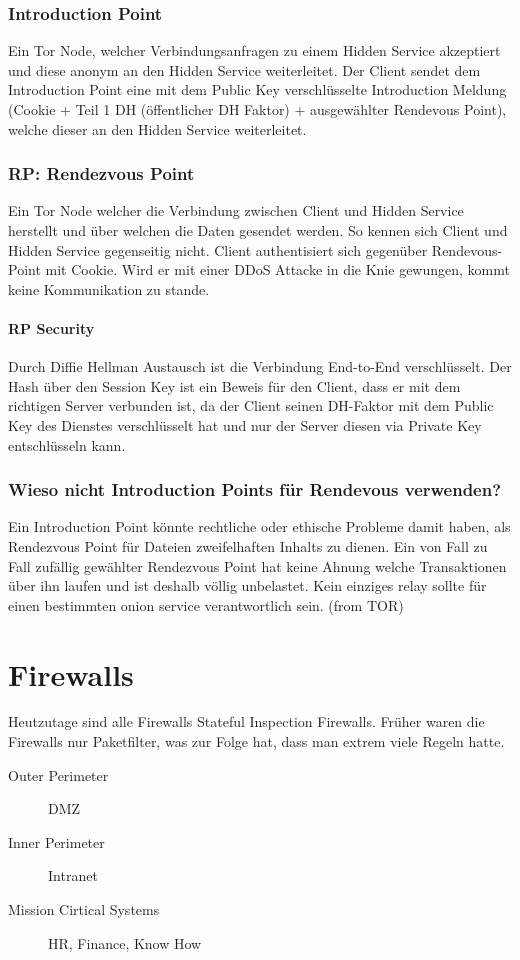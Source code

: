 \subsubsection{Introduction Point}
Ein Tor Node, welcher Verbindungsanfragen zu einem Hidden Service akzeptiert und diese anonym an den Hidden Service weiterleitet. Der Client sendet dem Introduction Point eine mit dem Public Key verschlüsselte Introduction Meldung (Cookie + Teil 1 DH (öffentlicher DH Faktor) + ausgewählter Rendevous Point), welche dieser an den Hidden Service weiterleitet. 

\subsubsection{RP: Rendezvous Point}
Ein Tor Node welcher die Verbindung zwischen Client und Hidden Service herstellt und über welchen die Daten gesendet werden. So kennen sich Client und Hidden Service gegenseitig nicht. Client authentisiert sich gegenüber Rendevous-Point mit Cookie. Wird er mit einer DDoS Attacke in die Knie gewungen, kommt keine Kommunikation zu stande.

\paragraph{RP Security} Durch Diffie Hellman Austausch ist die Verbindung End-to-End verschlüsselt. Der Hash über den Session Key ist ein Beweis für den Client, dass er mit dem richtigen Server verbunden ist, da der Client seinen DH-Faktor mit dem Public Key des Dienstes verschlüsselt hat und nur der Server diesen via Private Key entschlüsseln kann.

\subsubsection{Wieso nicht Introduction Points für Rendevous verwenden?}
Ein Introduction Point könnte rechtliche oder ethische Probleme damit haben, als Rendezvous Point für Dateien zweifelhaften Inhalts zu dienen. Ein von Fall zu Fall zufällig gewählter Rendezvous Point hat keine Ahnung welche Transaktionen über ihn laufen und ist deshalb völlig unbelastet. Kein einziges relay sollte für einen bestimmten onion service verantwortlich sein. (from TOR)


\section{Firewalls}
Heutzutage sind alle Firewalls Stateful Inspection Firewalls. Früher waren die Firewalls nur Paketfilter, was zur Folge hat, dass man extrem viele Regeln hatte.
\begin{description}
	\item[Outer Perimeter] DMZ
	\item[Inner Perimeter] Intranet
	\item[Mission Cirtical Systems] HR, Finance, Know How
\end{description}

